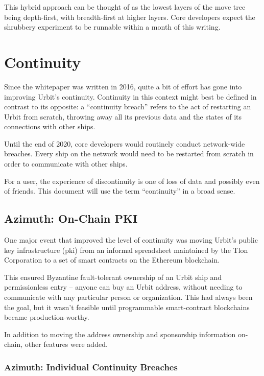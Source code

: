 \documentclass[twoside]{article}
\begin{document}
This hybrid approach can be thought of as the lowest layers of the move tree being depth-first, with breadth-first at higher layers.  Core developers expect the shrubbery experiment to be runnable within a month of this writing.

\section{Continuity}

Since the whitepaper was written in 2016, quite a bit of effort has gone into improving Urbit's continuity.  Continuity in this context might best be defined in contrast to its opposite: a ``continuity breach'' refers to the act of restarting an Urbit from scratch, throwing away all its previous data and the states of its connections with other ships.

Until the end of 2020, core developers would routinely conduct network-wide breaches.  Every ship on the network would need to be restarted from scratch in order to communicate with other ships.

For a user, the experience of discontinuity is one of loss of data and possibly even of friends.  This document will use the term ``continuity'' in a broad sense.

\subsection{Azimuth: On-Chain PKI}

One major event that improved the level of continuity was moving Urbit's public key infrastructure ({\sc pki}) from an informal spreadsheet maintained by the Tlon Corporation to a set of smart contracts on the Ethereum blockchain.

This ensured Byzantine fault-tolerant ownership of an Urbit ship and permissionless entry – anyone can buy an Urbit address, without needing to communicate with any particular person or organization.  This had always been the goal, but it wasn't feasible until programmable smart-contract blockchains became production-worthy.

In addition to moving the address ownership and sponsorship information on-chain, other features were added.

\subsubsection{Azimuth: Individual Continuity Breaches}
\end{document}
